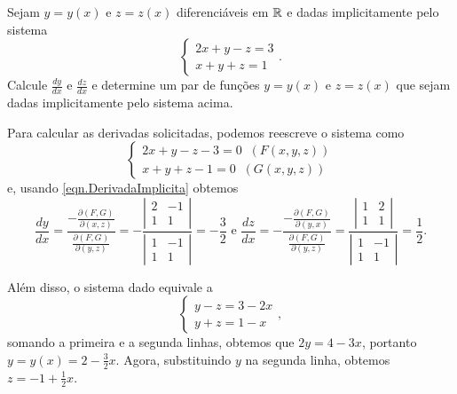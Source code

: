         \begin{example}
            Sejam \(y = y(x)\) e \(z = z(x)\) diferenciáveis em \(\mathbb{R}\) e dadas implicitamente pelo sistema
                \[\begin{cases}
                    2x + y - z = 3 \\
                    x + y + z = 1
                \end{cases}.\]
            Calcule \(\frac{dy}{dx}\) e \(\frac{dz}{dx}\) e determine um par de funções \(y=y(x)\) e \(z = z(x)\) que sejam dadas implicitamente pelo sistema acima.

            Para calcular as derivadas solicitadas, podemos reescreve o sistema como
                \[\begin{cases}
                    2x + y - z - 3 = 0\;\; (F(x,y,z))\\
                    x + y + z - 1 = 0\;\; (G(x,y,z))
                \end{cases}\]
            e, usando \eqref{eqn.DerivadaImplicita} obtemos
                \[\frac{dy}{dx} = \frac{-\frac{\partial(F,G)}{\partial(x,z)}}{\frac{\partial(F,G)}{\partial(y,z)}} = -\frac{\left|\begin{matrix}
                    2 & -1 \\ 1 & 1
                \end{matrix}\right|}{\left|\begin{matrix}
                    1 & -1 \\ 1 & 1
                \end{matrix}\right|} = -\frac{3}{2} \text{ e } \frac{dz}{dx} = -\frac{-\frac{\partial(F,G)}{\partial(y,x)}}{\frac{\partial(F,G)}{\partial(y,z)}} = \frac{\left|\begin{matrix}
                    1 & 2 \\ 1 & 1
                \end{matrix}\right|}{\left|\begin{matrix}
                    1 & -1 \\ 1 & 1
                \end{matrix}\right|} = \frac{1}{2}.\]

            Além disso, o sistema dado equivale a
                \[\begin{cases}
                    y - z = 3 - 2x \\
                    y + z = 1 - x
                \end{cases},\] somando a primeira e a segunda linhas, obtemos que \(2y = 4 - 3x\), portanto \(y = y(x) = 2 - \frac{3}{2}x\). Agora, substituindo \(y\) na segunda linha, obtemos \(z = -1 + \frac{1}{2}x\).
        \end{example}

